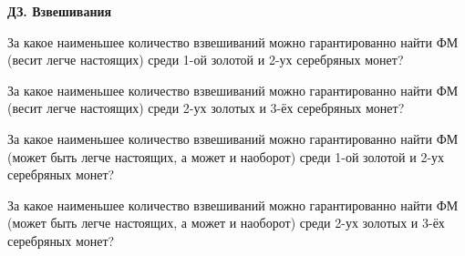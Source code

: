 \centerline{\bf \Huge ДЗ. Взвешивания}
\centerline{\bf \Huge }

 За какое наименьшее количество взвешиваний можно гарантированно найти ФМ (весит легче настоящих) среди 1-ой золотой и 2-ух серебряных монет?

 За какое наименьшее количество взвешиваний можно гарантированно найти ФМ (весит легче настоящих) среди 2-ух золотых и 3-ёх серебряных монет?

 За какое наименьшее количество взвешиваний можно гарантированно найти ФМ (может быть легче настоящих, а может и наоборот) среди 1-ой золотой и 2-ух серебряных монет?

 За какое наименьшее количество взвешиваний можно гарантированно найти ФМ (может быть легче настоящих, а может и наоборот) среди 2-ух золотых и 3-ёх серебряных монет?